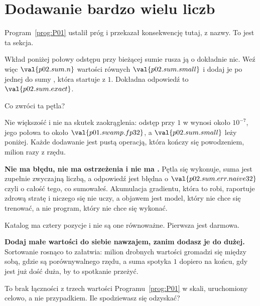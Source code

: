 \section{Dodawanie bardzo wielu liczb}
\label{sec:P02-summation}

\begin{fr}
Program~\ref{prog:P01} ustalił próg i przekazał konsekwencję tutaj, z nazwy. To
jest ta sekcja.

Wkład poniżej połowy odstępu przy bieżącej sumie rusza ją o dokładnie nic. Weź
więc $\val{p02.sum.n}$ wartości równych $\val{p02.sum.small}$ i dodaj je po
jednej do sumy , która startuje z $1$. Dokładna odpowiedź to
$\val{p02.sum.exact}$.

Co zwróci ta pętla?
\nextframe
\end{fr}

\begin{fr}
Nie większość i nie na skutek zaokrąglenia: odstęp przy $1$ w 
wynosi około $10^{-7}$, jego połowa to około $\val{p01.swamp.fp32}$, a
$\val{p02.sum.small}$ leży poniżej. Każde dodawanie jest pustą operacją, która
kończy się powodzeniem, milion razy z rzędu.

\begin{warning}
\textbf{Nie ma błędu, nie ma ostrzeżenia i nie ma .} Pętla się
wykonuje, suma jest zupełnie zwyczajną liczbą, a odpowiedź jest błędna o
$\val{p02.sum.err.naive32}$ \dash{} czyli o całość tego, co sumowałeś.
Akumulacja gradientu, która to robi, raportuje zdrową stratę i niczego się nie
uczy, a objawem jest model, który nie chce się trenować, a nie program, który
nie chce się wykonać.
\end{warning}
\end{fr}

\begin{fr}
Katalog ma cztery pozycje i nie są one równoważne. Pierwsza jest darmowa.

\textbf{Dodaj małe wartości do siebie nawzajem, zanim dodasz je do dużej.}
Sortowanie rosnąco to załatwia: milion drobnych wartości gromadzi się między
sobą, gdzie są porównywalnego rzędu, a suma spotyka $1$ dopiero na końcu, gdy
jest już dość duża, by to spotkanie przeżyć.

To brak łączności z trzech wartości Programu~\ref{prog:P01} w skali,
uruchomiony celowo, a nie przypadkiem. Ile spodziewasz się odzyskać?
\nextframe
\end{fr}

